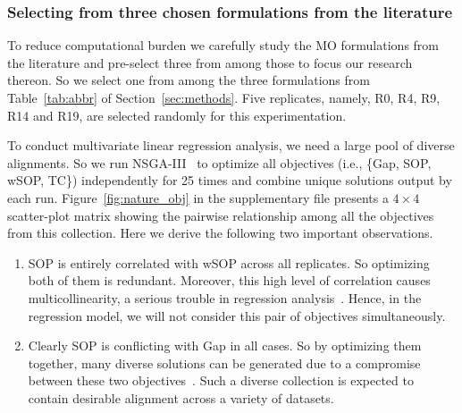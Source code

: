 \subsubsection{Selecting from three chosen formulations from the literature}
\label{sec:existing_msa_formulation}
To reduce computational burden we carefully study the MO formulations from the literature and pre-select three from among those to focus our research thereon. So we select one from among the three formulations from Table~\ref{tab:abbr} of Section~\ref{sec:methods}. 
Five replicates, namely, R0, R4, R9, R14 and R19, are selected randomly for this experimentation. 



To conduct multivariate linear regression analysis, we need a large pool of diverse alignments. So we run NSGA-III~\citep{deb2014evolutionary} to optimize all objectives (i.e., \{Gap, SOP, wSOP, TC\}) independently for 25 times and combine unique solutions output by each run. Figure~\ref{fig:nature_obj} in the supplementary file presents a $ 4\times4 $ scatter-plot matrix showing the pairwise relationship among all the objectives from this collection. Here we derive the following two important observations.
\begin{enumerate}
	
	\item SOP is entirely correlated with wSOP across all replicates. So optimizing both of them is redundant. Moreover, this high level of correlation causes multicollinearity, a serious trouble in regression analysis~\citep{montgomery2012introduction}. Hence, in the regression model, we will not consider this pair of objectives simultaneously.  
	
	\item Clearly SOP is conflicting with Gap in all cases. So by optimizing them together, many diverse solutions can be generated due to a compromise between these two objectives~\citep{kalyanmoy2001multi}. Such a diverse collection is expected to contain desirable alignment across a variety of datasets.
	
\end{enumerate}

